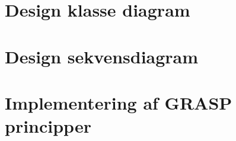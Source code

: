 \section{Design klasse diagram}

\section{Design sekvensdiagram}

\section{Implementering af GRASP principper}